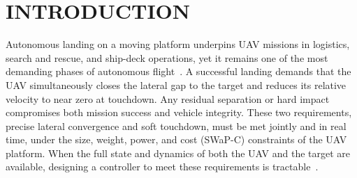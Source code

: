 \documentclass{IEEEtaes}
\begin{document}

\section{INTRODUCTION} \label{intro: section}
Autonomous landing on a moving platform underpins UAV missions in logistics, search and rescue, and ship-deck operations, yet it remains one of the most demanding phases of autonomous flight~\cite{cho2022,gupta2023,angelis2026}. A successful landing demands that the UAV simultaneously closes the lateral gap to the target and reduces its relative velocity to near zero at touchdown. Any residual separation or hard impact compromises both mission success and vehicle integrity. These two requirements, precise lateral convergence and soft touchdown, must be met jointly and in real time, under the size, weight, power, and cost (SWaP-C) constraints of the UAV platform. When the full state and dynamics of both the UAV and the target are available, designing a controller to meet these requirements is tractable~\cite{kumar2024,marcon2018}.
\end{document}
